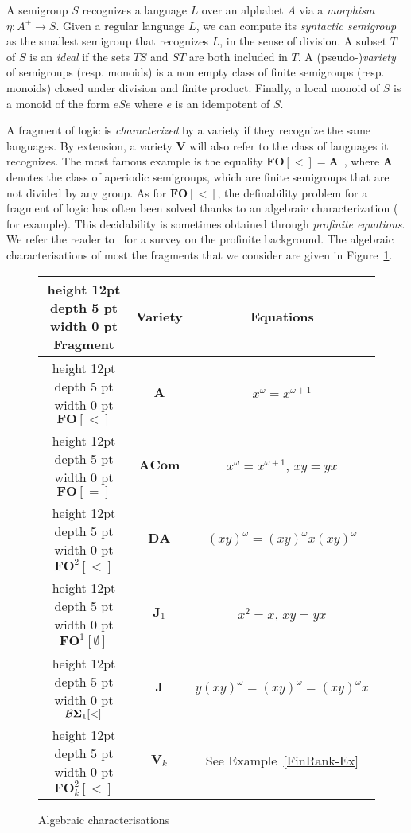 \documentclass[submission,hidelink]{dmtcs-episciences}
\newcommand{\A}{\mathbf{A}}
\newcommand{\DA}{\mathbf{DA}}
\newcommand{\V}{\mathbf{V}}
\newcommand{\J}{\mathbf{J}}
\newcommand{\FO}{\mathbf{FO}}
\newcommand{\BS}{\mathbf{{\cal B}\Sigma}}
\newcommand{\tvi}{\vrule height 12pt depth 5 pt width 0 pt}
\newcommand{\ACOM}{\mathbf{ACom}}
\begin{document}
A semigroup $S$ recognizes a language $L$ over an alphabet $A$ via a \emph{morphism}
${\eta:A^+\to S}$.
Given a regular language $L$, we can compute its \emph{syntactic semigroup} as the smallest semigroup that recognizes $L$, in the sense of division.
A subset $T$ of $S$ is an \emph{ideal} if the sets $TS$ and $ST$ are both included in $T$.
A (pseudo-)\emph{variety} of semigroups (resp. monoids) is a non empty class of finite semigroups (resp. monoids) closed under
division and finite product.
Finally, a local monoid of $S$ is a monoid of the form $eSe$ where $e$ is an idempotent of $S$.

A fragment of logic is \emph{characterized} by a variety if they recognize the same languages.
By extension, a variety $\V$ will also refer to the class of languages it recognizes.
The most famous example is the equality $\FO[<]=\A$~\citep{MP71,Schutzenberger65}, where $\A$ denotes the class of aperiodic semigroups, which are
finite semigroups that are not divided by any group.
As for $\FO[<]$, the definability problem for a fragment of logic has often been solved thanks to an algebraic characterization (\cite{SI75,Th81,TW98} for example).
This decidability is sometimes obtained through \emph{profinite equations}.
We refer the reader to~\cite{PIN09} for a survey on the profinite background. The algebraic characterisations of most the fragments that we consider are given in Figure~\ref{Tableau:Alg}.
\begin{figure}[h]
\begin{tabular}{|c|c|c|}
\hline\tvi
Fragment & Variety & Equations \\
\hline\tvi
$\FO[<]$ & $\A$  & $x^\omega=x^{\omega+1}$ \\
\hline\tvi
$\FO[=]$ & $\ACOM$ & $x^\omega=x^{\omega+1}$, $xy=yx$ \\
\hline\tvi
$\FO^2[<] $& $\DA$ & $(xy)^\omega= (xy)^\omega x (xy)^\omega$ \\
\hline\tvi
$\FO^1[\emptyset]$ & $\J_1$ & $x^2=x$, $xy=yx$ \\
\hline\tvi
$\mathbf{\BS}_1[<]$ & $\J$ & $y(xy)^\omega=(xy)^\omega=(xy)^\omega x$\\
\hline\tvi
$\FO^2_k[<]$ & $\V_k$ & See Example~\ref{FinRank-Ex} \\
\hline


\end{tabular}
\centering
\caption{Algebraic characterisations}\label{Tableau:Alg}
\end{figure}
\end{document}
